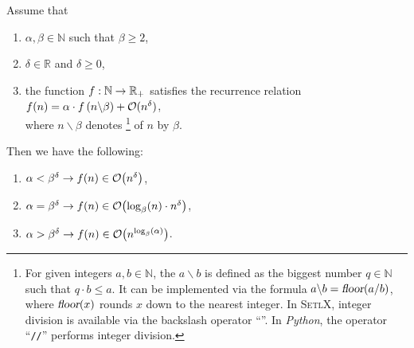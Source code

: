 \begin{Theorem} 
  Assume that 
  \begin{enumerate}
  \item $\alpha,\beta \in \mathbb{N}$ such that  $\beta \geq 2$,
  \item $\delta \in \mathbb{R}$ and $\delta \geq 0$,
  \item the function $f:{\mathbb N} \rightarrow {\mathbb R}_+$ satisfies the recurrence relation
        \\[0.2cm]
        \hspace*{1.3cm}
        $f(n) = \alpha \cdot f\left(n \backslash \beta\right) + \mathcal{O}(n^\delta)$,
        \\[0.2cm]
        where $n \backslash \beta$ denotes \footnote{
          For given integers $a, b \in \mathbb{N}$, the  $a \backslash b$
          is defined as the biggest number $q \in \mathbb{N}$ such that $q \cdot b \leq a$.  It can
          be implemented via the formula $a \backslash b = \textsl{floor}(a/b)$, where
          $\textsl{floor}(x)$ rounds $x$ down to the nearest integer.  In \textsc{SetlX}, integer
          division is available via the backslash operator ``\texttt{}''.  In \textsl{Python},
          the operator ``\texttt{//}'' performs integer division.
        }  
        of $n$ by $\beta$.
  \end{enumerate}
  Then we have the following:
  \begin{enumerate}
  \item $\alpha < \beta^\delta\rightarrow f(n) \in \mathcal{O}\bigl(n^{\delta}\bigr)$,
  \item $\alpha = \beta^\delta\rightarrow f(n) \in \mathcal{O}\bigl(\log_\beta(n) \cdot n^{\delta}\bigr)$,
  \item $\alpha > \beta^{\delta} \rightarrow f(n) \in \mathcal{O}\bigl(n^{\log_{\beta}(\alpha)}\bigr)$. 
  \end{enumerate}
\end{Theorem}

